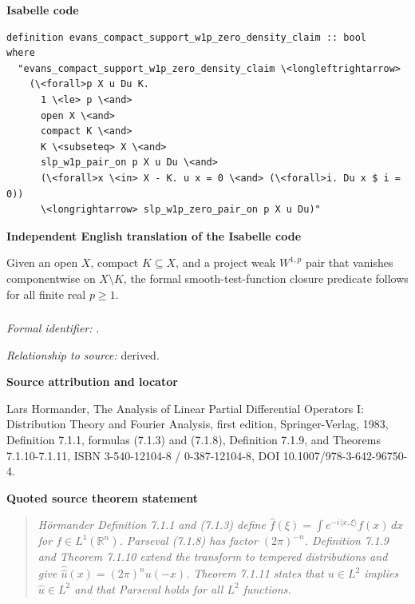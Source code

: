 \documentclass[10pt,oneside]{article}
\newenvironment{sourcequote}{\begin{quote}\itshape}{\end{quote}}
\newcommand{\reviewlabel}[1]{\par\smallskip\noindent\textsf{\bfseries #1}\par\smallskip}
\begin{document}
\reviewlabel{Isabelle code}
\begin{lstlisting}
definition evans_compact_support_w1p_zero_density_claim :: bool
where
  "evans_compact_support_w1p_zero_density_claim \<longleftrightarrow>
    (\<forall>p X u Du K.
      1 \<le> p \<and>
      open X \<and>
      compact K \<and>
      K \<subseteq> X \<and>
      slp_w1p_pair_on p X u Du \<and>
      (\<forall>x \<in> X - K. u x = 0 \<and> (\<forall>i. Du x $ i = 0))
      \<longrightarrow> slp_w1p_zero_pair_on p X u Du)"
\end{lstlisting}

\reviewlabel{Independent English translation of the Isabelle code}
Given an open $X$, compact $K\subseteq X$, and a project weak $W^{1,p}$ pair that vanishes componentwise on $X\setminus K$, the formal smooth-test-function closure predicate follows for all finite real $p\geq1$.

\subsubsection{\texttt{}}
\noindent\textit{Formal identifier:} \texttt{}.\par
\noindent\textit{Relationship to source:} derived.

\reviewlabel{Source attribution and locator}
Lars Hormander, The Analysis of Linear Partial Differential Operators I: Distribution Theory and Fourier Analysis, first edition, Springer-Verlag, 1983, Definition 7.1.1, formulas (7.1.3) and (7.1.8), Definition 7.1.9, and Theorems 7.1.10-7.1.11, ISBN 3-540-12104-8 / 0-387-12104-8, DOI 10.1007/978-3-642-96750-4.

\reviewlabel{Quoted source theorem statement}
\begin{sourcequote}
H\"ormander Definition 7.1.1 and (7.1.3) define $\widehat f(\xi)=\int e^{-i\langle x,\xi\rangle}f(x)\,dx$ for $f\in L^1(\mathbb R^n)$. Parseval (7.1.8) has factor $(2\pi)^{-n}$. Definition 7.1.9 and Theorem 7.1.10 extend the transform to tempered distributions and give $\widehat{\widehat u}(x)=(2\pi)^n u(-x)$. Theorem 7.1.11 states that $u\in L^2$ implies $\widehat u\in L^2$ and that Parseval holds for all $L^2$ functions.
\end{sourcequote}
\end{document}
